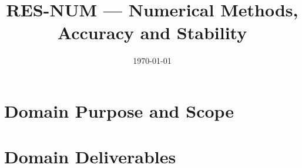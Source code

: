 \documentclass[12pt,a4paper]{article}
\title{RES-NUM --- Numerical Methods, Accuracy and Stability}
\author{}
\date{\today}
\begin{document}
\maketitle

\tableofcontents
\clearpage

\section{Domain Purpose and Scope}
\label{sec:res-num-domain-purpose}


\section{Domain Deliverables}
\label{sec:res-num-domain-deliverables}












\clearpage
\printbibliography[
  heading=bibintoc,
  title={References}
]
\end{document}
